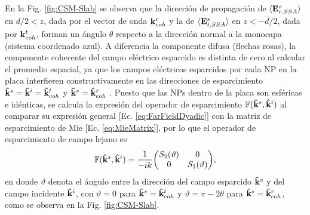 En la Fig. \ref{fig:CSM-Slab} se observa que la dirección de propagación de  $\langle \vb{E}^s_{r,SSA}\rangle$ en $d/2<z$, dada por el vector de onda $\vb{k}^r_{coh}$ y la de $\langle \vb{E}^s_{t,SSA}\rangle$ en  $z<-d/2$, dada por $\vb{k}^t_{coh}$, forman un ángulo $\theta$ respecto a la dirección normal a la monocapa (sistema coordenado azul). A diferencia la componente difusa (flechas rosas), la componente coherente del campo eléctrico esparcido es distinta de cero al calcular el promedio espacial, ya que los campos eléctricos esparcidos por cada NP en la placa interfieren constructivamente en las direcciones de esparcimiento $\vu{k}^s =\vu{k}^i=\vu{k}^t_{coh}$ y $\vu{k}^s =\vu{k}^r_{coh}$ \cite{garcia2012multiple}. Puesto que las NPs dentro de la placa son esféricas e idénticas, se calcula la expresión del operador de esparcimiento $\mathbb{F}(\vu{k}^s,\vu{k}^i)$ al comparar su expresión general [Ec. \eqref{eq:FarFieldDyadic}] con la matriz de esparcimiento de Mie [Ec. \eqref{eq:MieMatrix}], por lo que el operador de esparcimiento de campo lejano es
%
	\begin{align}
	\mathbb{F}(\vu{k}^s,\vu{k}^i) = \frac{1}{-ik} 
	 \mqty(S_2(\vartheta) & 0 \\ 0 & S_1(\vartheta)),
	 \label{eq:FFDydadic-Mie}
	\end{align}
%
en donde $\vartheta$ denota el ángulo entre la dirección del campo esparcido $\vu{k}^s$ y del campo incidente $\vu{k}^i$, con $\vartheta = 0$ para $\vu{k}^s = \vu{k}^t_{coh}$ y $\vartheta = \pi-2\theta$  para $\vu{k}^s = \vu{k}^r_{coh}$, como se observa en la Fig. \ref{fig:CSM-Slab}.
	
